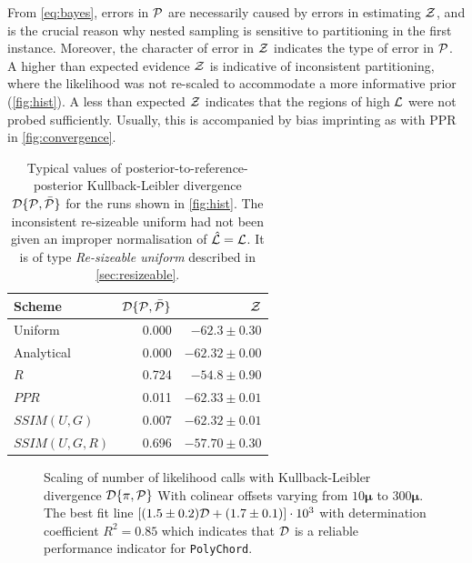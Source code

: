 \documentclass[usenatbib]{mnras}
\begin{document}
From \cref{eq:bayes}, errors in ${\cal P}$ are necessarily caused by
errors in estimating ${\cal Z}$, and is the crucial reason why nested
sampling is sensitive to partitioning in the first instance. Moreover,
the character of error in ${\cal Z}$ indicates the type of error in
${\cal P}$. A higher than expected evidence ${\cal Z}$ is indicative
of inconsistent partitioning, where the likelihood was not re-scaled
to accommodate a more informative prior (\cref{fig:hist}). A less than
expected ${\cal Z}$ indicates that the regions of high ${\cal L}$ were
not probed sufficiently. Usually, this is accompanied by bias
imprinting as with PPR in \cref{fig:convergence}.

\begin{table}
  \centering
  
  \caption{Typical values of posterior-to-reference-posterior
    Kullback-Leibler divergence ${\cal D}\{{\cal P}, \bar{\cal P}\}$
    for the runs shown in \cref{fig:hist}. The inconsistent
    re-sizeable uniform had not been given an improper normalisation
    of $\hat{\cal L} = {\cal L}$. It is of type \emph{Re-sizeable
      uniform} described in \cref{sec:resizeable}.}
  \begin{tabular}{lrr}
    \textbf{Scheme} & ${\cal D}\{ {\cal P}, \bar{\cal P}\}$ & ${\cal Z}$\\
    \hline
    Uniform & 0.000 & \(-62.3 \pm 0.30\)\\
    Analytical & 0.000 & \(-62.32 \pm 0.00\) \\
    $R$ & 0.724 & \(-54.8 \pm 0.90\)\\
    $PPR$ & 0.011 & \(-62.33 \pm 0.01\)\\
    $SSIM(U, G)$ & 0.007 & \(-62.32 \pm 0.01\)\\
    $SSIM(U, G, R)$ & 0.696 & \(-57.70 \pm 0.30\)\\
  \end{tabular}
  \label{tab:hist}
\end{table}


\begin{figure}
  
  \caption{Scaling of number of likelihood calls with Kullback-Leibler
    divergence \({\cal D}\{ \pi, {\cal P}\}\) With colinear offsets
    varying from $10\bm{\mu}$ to $300\bm{\mu}$. The best fit line
    \(\left[(1.5 \pm 0.2) {\cal D} + (1.7 \pm 0.1)\right]\cdot 10^3 \)
    with determination coefficient \(R^{2} = 0.85\) which indicates
    that \({\cal D}\) is a reliable performance indicator for
    \texttt{PolyChord}.\label{fig:kl-scaling}}
\end{figure}
\end{document}
